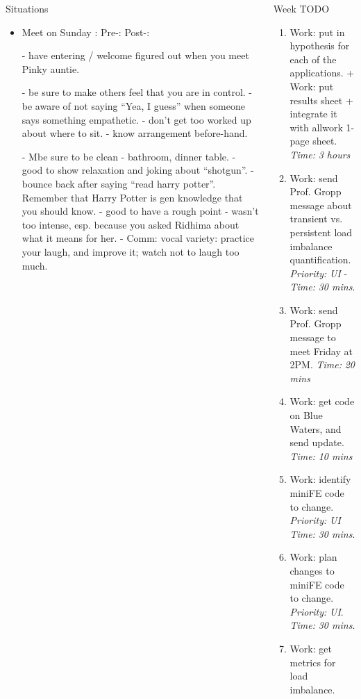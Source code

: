 \documentclass[serif, mathserif, final]{beamer}
\newcommand{\timeEst}[1]{\textit{Time:} \textit{#1}}
\newcommand{\priority}[1]{\textit{Priority:} \textit{#1}}
\begin{document}
\begin{frame}{}
\begin{columns}
\begin{column}{0.25\linewidth}
\begin{block}{ Situations}
\begin{itemize}
    \item \tiny Meet on Sunday : Pre-:  Post-:  
      
      - have entering / welcome figured out when you meet Pinky auntie. 
      
      - be sure to make others feel that you are in control. 
      - be aware of not saying ``Yea, I guess'' when someone says something empathetic. 
      - don't get too worked up about where to sit. - know arrangement before-hand. 
      
      - Mbe sure to be clean - bathroom, dinner table. 
      - good to show relaxation and joking about ``shotgun''.
      - bounce back after saying ``read harry potter''. Remember that Harry Potter is gen knowledge that you should know. 
      - good to have a rough point - wasn't too intense, esp. because you asked Ridhima about what it means for her. 
      - Comm: vocal variety: practice your laugh, and improve it; watch not to laugh too much. 
    \end{itemize}
  \end{block} 
\end{column} %
\begin{column}{0.50\linewidth}

\begin{block}{ Week TODO} 

\begin{enumerate} 


\item \tiny Work: put in hypothesis for each of the applications.  + Work: put results sheet  + integrate it with allwork 1-page sheet.  \timeEst{3 hours}
\item \tiny Work: send Prof. Gropp message about transient vs. persistent load imbalance quantification. \priority{UI} - \timeEst{30 mins}. 
\item \tiny Work: send Prof. Gropp message to meet Friday at 2PM. \timeEst{20 mins} 
\item \tiny Work: get code on Blue Waters, and send update. \timeEst{10 mins} 
\item \tiny Work: identify miniFE code to change.  \priority{UI} \timeEst{30 mins}. 
\item \tiny Work: plan changes to miniFE code to change. \priority{UI}. \timeEst{30 mins}. 
\item \tiny Work: get metrics for load imbalance. 


\end{enumerate}
\end{block}
\end{column}
\end{columns}
\end{frame}
\end{document}
